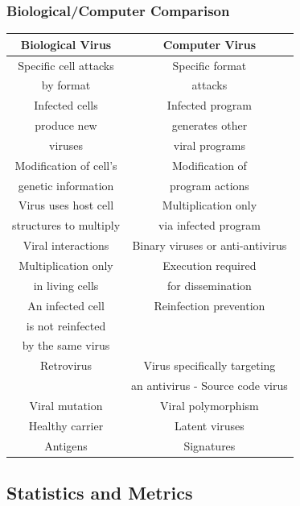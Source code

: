 \documentclass{beamer}
\begin{document}
\begin{frame}
\frametitle{Biological/Computer Comparison}
{\scriptsize
\begin{center}
\begin{tabular}{|c|c|}
\hline
Biological Virus & Computer Virus \\
\hline
\hline
Specific cell attacks & Specific format \\
by format & attacks \\
\hline
Infected cells & Infected program \\
produce new  & generates other \\
viruses & viral programs \\
\hline
Modification of cell's & Modification of \\
genetic information & program actions \\
\hline
Virus uses host cell & Multiplication only \\
structures to multiply & via infected program \\
\hline
Viral interactions & Binary viruses or anti-antivirus \\
Multiplication only & Execution required \\
in living cells & for dissemination \\
\hline
An infected cell & Reinfection prevention \\
is not reinfected & \\
by the same virus & \\
\hline
Retrovirus & Virus specifically targeting \\
& an antivirus - Source code virus \\
\hline
Viral mutation & Viral polymorphism \\
\hline
Healthy carrier & Latent viruses \\
\hline
Antigens & Signatures \\
\hline
\end{tabular}
\end{center}
}
\end{frame}





\subsection{Statistics and Metrics}
\end{document}
